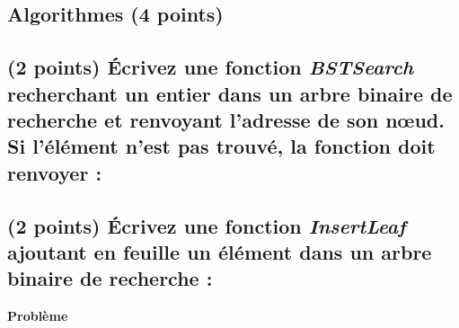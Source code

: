 \documentclass[11pt,a4paper]{article}
\begin{document}
\begin{center}
\begin{table}[ht!]
\begin{minipage}{0.50\textwidth}
   \end{minipage}
\end{table}

\end{center}

\clearpage


\subsection*{Algorithmes (4 points) }

\subsection{(2 points) \'Ecrivez une fonction \textit{BSTSearch} recherchant un entier dans un arbre binaire de recherche et renvoyant l'adresse de son nœud. Si l'élément n'est pas trouvé, la fonction doit renvoyer  : }

\begin{center}
\end{center}


\subsection{(2 points) \'Ecrivez une fonction \textit{InsertLeaf} ajoutant en feuille un élément dans un arbre binaire de recherche : }

\begin{center}
\end{center}

\clearpage


\vfillFirst

\begin{center}
{\LARGE \textbf{Problème} }
\end{center}

\vfillLast

\clearpage


\vfillFirst
\end{document}

